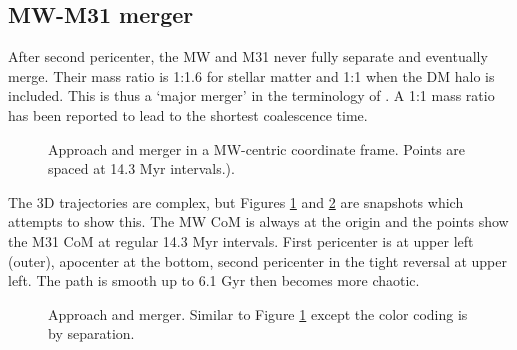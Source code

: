 \documentclass[twocolumn]{aastex63}
\newcommand{\todo}{\color{red}{TODO}\color{black}\hspace{2mm}}
\begin{document}
\subsection{MW-M31 merger}


After second pericenter, the MW and M31 never fully separate and eventually merge. Their mass ratio is 1:1.6 for stellar matter and 1:1 when the DM halo is included. This is thus a `major merger' in the terminology of \todo{ref?}. A 1:1 mass ratio has been reported \citep{boylan-kolchin_dynamical_2008, ji_lifetime_2014} to lead to the shortest coalescence time.

\begin{figure}[htb!]
	\caption{Approach and merger in a MW-centric coordinate frame. Points are spaced at 14.3 Myr intervals.).
		\label{fig:MW_M31_traj_time}}
\end{figure}

The 3D trajectories are complex, but Figures \ref{fig:MW_M31_traj_time} and \ref{fig:MW_M31_traj_sep} are snapshots which attempts to show this. The MW CoM is always at the origin and the points show the M31 CoM at regular 14.3 Myr intervals. First pericenter is at upper left (outer), apocenter at the bottom, second pericenter in the tight reversal at upper left. The path is smooth up to 6.1 Gyr then becomes more chaotic.

\begin{figure}[htb!]
	\caption{Approach and merger. Similar to Figure \ref{fig:MW_M31_traj_time} except the color coding is by separation.
		\label{fig:MW_M31_traj_sep}}
\end{figure}
\end{document}
